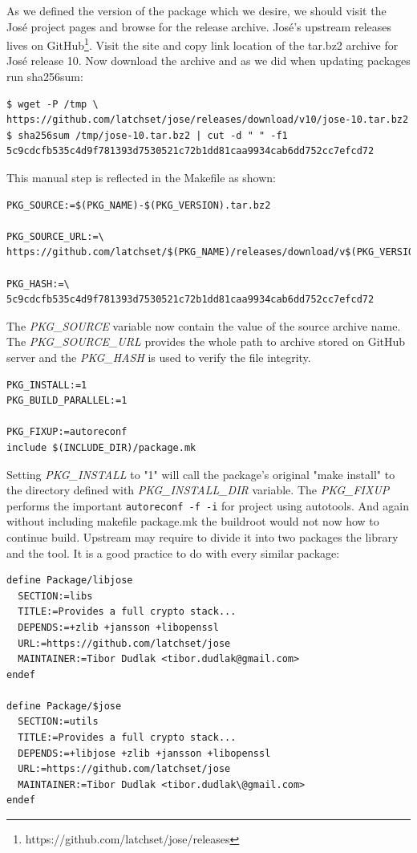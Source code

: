 As we defined the version of the package which we desire, we should visit the José project pages and browse for the release archive.
José's upstream releases lives on GitHub\footnote{https://github.com/latchset/jose/releases}.
Visit the site and copy link location of the tar.bz2 archive for José release 10.
Now download the archive and as we did when updating packages run sha256sum:
\begin{lstlisting}[columns=fixed,basicstyle=\ttfamily\footnotesize,tabsize=4,backgroundcolor=\color{yellow!10}]
$ wget -P /tmp \
https://github.com/latchset/jose/releases/download/v10/jose-10.tar.bz2
$ sha256sum /tmp/jose-10.tar.bz2 | cut -d " " -f1
5c9cdcfb535c4d9f781393d7530521c72b1dd81caa9934cab6dd752cc7efcd72
\end{lstlisting}
This manual step is reflected in the Makefile as shown:
\begin{lstlisting}[columns=fixed,basicstyle=\ttfamily\footnotesize,tabsize=4,backgroundcolor=\color{yellow!10}]
PKG_SOURCE:=$(PKG_NAME)-$(PKG_VERSION).tar.bz2

PKG_SOURCE_URL:=\
https://github.com/latchset/$(PKG_NAME)/releases/download/v$(PKG_VERSION)/

PKG_HASH:=\
5c9cdcfb535c4d9f781393d7530521c72b1dd81caa9934cab6dd752cc7efcd72
\end{lstlisting}
The {\it PKG\_SOURCE} variable now contain the value of the source archive name.
The {\it PKG\_SOURCE\_URL} provides the whole path to archive stored on GitHub server and the {\it PKG\_HASH} is used to verify the file integrity.
\begin{lstlisting}[columns=fixed,basicstyle=\ttfamily\footnotesize,tabsize=4,backgroundcolor=\color{yellow!10}]
PKG_INSTALL:=1
PKG_BUILD_PARALLEL:=1

PKG_FIXUP:=autoreconf
include $(INCLUDE_DIR)/package.mk
\end{lstlisting}
Setting {\it PKG\_INSTALL} to "1" will call the package's original "make install" to the directory defined with {\it PKG\_INSTALL\_DIR} variable.
The {\it PKG\_FIXUP} performs the important {\tt autoreconf -f -i} for project using autotools.
And again without including makefile package.mk the buildroot would not now how to continue build.
Upstream may require to divide it into two packages the library and the tool.
It is a good practice to do with every similar package:
\begin{lstlisting}[columns=fixed,basicstyle=\ttfamily\footnotesize,tabsize=4,backgroundcolor=\color{yellow!10}]
define Package/libjose
  SECTION:=libs
  TITLE:=Provides a full crypto stack...
  DEPENDS:=+zlib +jansson +libopenssl
  URL:=https://github.com/latchset/jose
  MAINTAINER:=Tibor Dudlak <tibor.dudlak@gmail.com>
endef

define Package/$jose
  SECTION:=utils
  TITLE:=Provides a full crypto stack...
  DEPENDS:=+libjose +zlib +jansson +libopenssl
  URL:=https://github.com/latchset/jose
  MAINTAINER:=Tibor Dudlak <tibor.dudlak\@gmail.com>
endef
\end{lstlisting}

